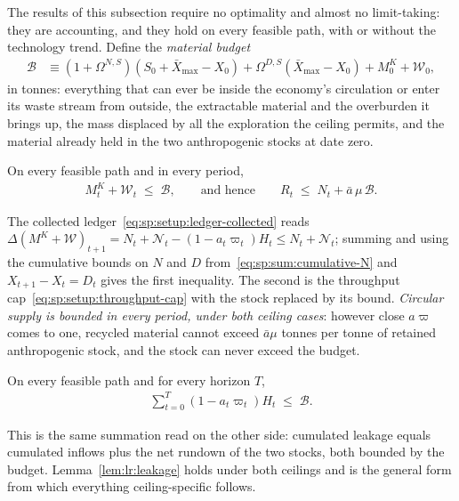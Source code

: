 The results of this subsection require no optimality and almost no limit-taking: they are accounting, and they hold on every feasible path, with or without the technology trend. Define the \emph{material budget}
\begin{align}
\mathcal B &\equiv \left(1+\Omega^{N,S}\right)\left(S_0+\bar X_{\max}-X_0\right)+\Omega^{D,S}\left(\bar X_{\max}-X_0\right)+M^K_0+\mathcal W_0,
\label{eq:sp:lr:budget}
\end{align}
in tonnes: everything that can ever be inside the economy's circulation or enter its waste stream from outside, the extractable material and the overburden it brings up, the mass displaced by all the exploration the ceiling permits, and the material already held in the two anthropogenic stocks at date zero.

\begin{lemma}\label{lem:lr:stocks}
On every feasible path and in every period,
\begin{align}
M^K_t+\mathcal W_t \;\le\; \mathcal B,
\qquad\text{and hence}\qquad
R_t \;\le\; N_t+\bar a\,\mu\,\mathcal B .
\label{eq:sp:lr:stockbound}
\end{align}
\end{lemma}

The collected ledger~\eqref{eq:sp:setup:ledger-collected} reads $\Delta\left(M^K+\mathcal W\right)_{t+1}=N_t+\mathcal N_t-\left(1-a_t\varpi_t\right)H_t\le N_t+\mathcal N_t$; summing and using the cumulative bounds on $N$ and $D$ from~\eqref{eq:sp:sum:cumulative-N} and $X_{t+1}-X_t=D_t$ gives the first inequality. The second is the throughput cap~\eqref{eq:sp:setup:throughput-cap} with the stock replaced by its bound. \emph{Circular supply is bounded in every period, under both ceiling cases}: however close $a\varpi$ comes to one, recycled material cannot exceed $\bar a\mu$ tonnes per tonne of retained anthropogenic stock, and the stock can never exceed the budget.

\begin{lemma}\label{lem:lr:leakage}
On every feasible path and for every horizon $T$,
\begin{align}
\sum_{t=0}^{T} \left(1-a_t\varpi_t\right)H_t \;\le\; \mathcal B .
\label{eq:sp:lr:leakage}
\end{align}
\end{lemma}

This is the same summation read on the other side: cumulated leakage equals cumulated inflows plus the net rundown of the two stocks, both bounded by the budget. Lemma~\ref{lem:lr:leakage} holds under both ceilings and is the general form from which everything ceiling-specific follows.

